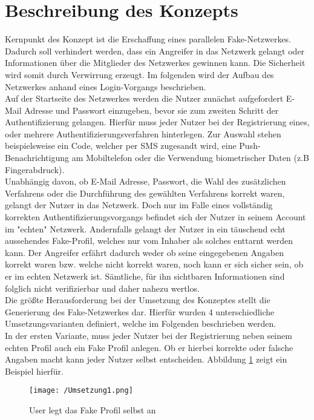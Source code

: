 \documentclass{sigchi}
\begin{document}
\section{Beschreibung des Konzepts}
\label{Konzept}
Kernpunkt des Konzept ist die Erschaffung eines parallelen Fake-Netzwerkes. Dadurch soll verhindert werden, dass ein Angreifer in das Netzwerk gelangt oder Informationen über die Mitglieder des Netzwerkes gewinnen kann. Die Sicherheit wird somit durch Verwirrung erzeugt. Im folgenden wird der Aufbau des Netzwerkes anhand eines Login-Vorgangs beschrieben. \\
Auf der Startseite des Netzwerkes werden die Nutzer zunächst aufgefordert E-Mail Adresse und Passwort einzugeben, bevor sie zum zweiten Schritt der Authentifizierung gelangen. Hierfür muss jeder Nutzer bei der Registrierung eines, oder mehrere Authentifizierungsverfahren hinterlegen. Zur Auswahl stehen beispielsweise ein Code, welcher per SMS zugesandt wird, eine Push-Benachrichtigung am Mobiltelefon oder die Verwendung biometrischer Daten (z.B Fingerabdruck).\\
Unabhängig davon, ob E-Mail Adresse, Passwort, die Wahl des zusätzlichen Verfahrens oder die Durchführung des gewählten Verfahrens korrekt waren, gelangt der Nutzer in das Netzwerk. Doch nur im Falle eines vollständig korrekten Authentifizierungsvorgangs befindet sich der Nutzer in seinem Account im "echten" Netzwerk. Andernfalls gelangt der Nutzer in ein täuschend echt aussehendes Fake-Profil, welches nur vom Inhaber als solches enttarnt werden kann.  Der Angreifer erfährt dadurch weder ob seine eingegebenen Angaben korrekt waren bzw. welche nicht korrekt waren, noch kann er sich sicher sein, ob er im echten Netzwerk ist. Sämtliche, für ihn sichtbaren Informationen sind folglich nicht verifizierbar und daher nahezu wertlos. \\
Die größte Herausforderung bei der Umsetzung des Konzeptes stellt die Generierung des Fake-Netzwerkes dar. Hierfür wurden 4 unterschiedliche Umsetzungsvarianten definiert, welche im Folgenden beschrieben werden. \\
In der ersten Variante, muss jeder Nutzer bei der Registrierung neben seinem echten Profil auch ein Fake Profil anlegen. Ob er hierbei korrekte oder falsche Angaben macht kann jeder Nutzer selbst entscheiden. Abbildung \ref{fig:Umsetzung1} zeigt ein Beispiel hierfür. 
\begin{figure}[htbp]
\texttt{[image: /Umsetzung1.png]}
\caption{User legt das Fake Profil selbst an}
\label{fig:Umsetzung1}
\end{figure}
\end{document}
